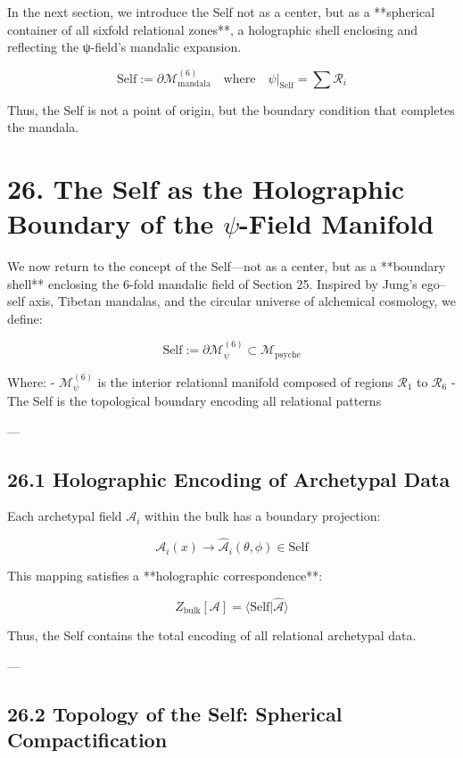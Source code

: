 \documentclass[12pt]{article}
\begin{document}
\begin{enumerate}
In the next section, we introduce the Self not as a center, but as a **spherical container of all sixfold relational zones**, a holographic shell enclosing and reflecting the ψ-field’s mandalic expansion.

\[
\text{Self} := \partial \mathcal{M}_{\text{mandala}}^{(6)} \quad \text{where} \quad \psi|_{\text{Self}} = \sum \mathcal{R}_i
\]

Thus, the Self is not a point of origin, but the boundary condition that completes the mandala.

\section*{26. The Self as the Holographic Boundary of the $\psi$-Field Manifold}

We now return to the concept of the Self—not as a center, but as a **boundary shell** enclosing the 6-fold mandalic field of Section 25. Inspired by Jung’s ego–self axis, Tibetan mandalas, and the circular universe of alchemical cosmology, we define:

\[
\text{Self} := \partial \mathcal{M}_\psi^{(6)} \subset \mathcal{M}_{\text{psyche}}
\]

Where:
- $\mathcal{M}_\psi^{(6)}$ is the interior relational manifold composed of regions $\mathcal{R}_1$ to $\mathcal{R}_6$
- The Self is the topological boundary encoding all relational patterns

---

\subsection*{26.1 Holographic Encoding of Archetypal Data}

Each archetypal field $\mathcal{A}_i$ within the bulk has a boundary projection:

\[
\mathcal{A}_i(x) \longrightarrow \hat{\mathcal{A}}_i(\theta, \phi) \in \text{Self}
\]

This mapping satisfies a **holographic correspondence**:

\[
Z_{\text{bulk}}[\mathcal{A}] = \langle \text{Self} | \hat{\mathcal{A}} \rangle
\]

Thus, the Self contains the total encoding of all relational archetypal data.

---

\subsection*{26.2 Topology of the Self: Spherical Compactification}


\end{enumerate}
\end{document}
